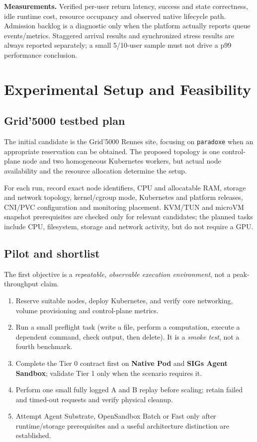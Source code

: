 \documentclass[
  a4paper,
]{article}
\begin{document}
\textbf{Measurements.} Verified
per-user return latency,
success and state correctness,
idle runtime cost, resource
occupancy and observed native
lifecycle path. Admission
backlog is a diagnostic only
when the platform actually
reports queue events/metrics.
Staggered arrival results and
synchronized stress results
are always reported separately;
a small 5/10-user sample
must not drive a p99
performance conclusion.

\section{Experimental Setup and Feasibility}
\label{sec:experimental-setup}
\subsection{Grid'5000 testbed plan}
The initial candidate is the
Grid'5000 Rennes site, focusing
on \texttt{paradoxe} when an
appropriate reservation can be
obtained. The proposed topology
is one control-plane node and
two homogeneous Kubernetes
workers, but actual node
availability and the resource
allocation determine the setup.

For each run, record exact
node identifiers, CPU and
allocatable RAM, storage
and network topology,
kernel/cgroup mode, Kubernetes
and platform releases,
CNI/PVC configuration
and monitoring placement.
KVM/TUN and microVM snapshot
prerequisites are checked
only for relevant candidates;
the planned tasks include
CPU, filesystem, storage
and network activity, but
do not require a GPU.

\subsection{Pilot and shortlist}
The first objective is a
\emph{repeatable, observable
execution environment}, not
a peak-throughput claim.

\begin{enumerate}
\item Reserve suitable nodes,
deploy Kubernetes, and
verify core networking,
volume provisioning and
control-plane metrics.
\item Run a small preflight
task (write a file, perform
a computation, execute
a dependent command,
check output, then delete).
It is a \emph{smoke test},
not a fourth benchmark.
\item Complete the Tier 0
contract first on
\textbf{Native Pod} and
\textbf{SIGs Agent Sandbox};
validate Tier 1 only when
the scenario requires it.
\item Perform one small
fully logged A and B replay
before scaling; retain
failed and timed-out
requests and verify
physical cleanup.
\item Attempt Agent Substrate,
OpenSandbox Batch or Fast
only after runtime/storage
prerequisites and a
useful architecture
distinction are established.
\end{enumerate}
\end{document}
